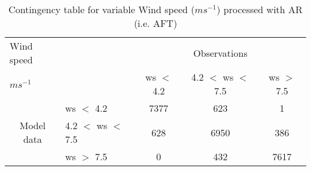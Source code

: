 \begin{table}[]
\begin{center}
\begin{tabular}{llccc}
\hline
{Wind speed}                                       &                                                    & \multicolumn{3}{c}{Observations}                 \\
{$m s^{-1}$}                                       &                             & ws $<$ 4.2   & 4.2 $<$ ws $<$ 7.5 & ws $>$ 7.5 \\
\hline
\multicolumn{1}{c}{\multirow{3}{*}{Model data}}  & ws $<$ 4.2             & 7377                & 623                       & 1              \\
                                                 & 4.2  $<$ ws $<$ 7.5 & 628                & 6950                       & 386              \\
                                                 & ws $>$ 7.5             & 0                & 432                       & 7617              \\
\hline
\end{tabular}
\end{center}
\caption{Contingency table for variable Wind speed ($m s^{-1}$) processed with AR (i.e. AFT)}
\label{tab:contingencywsAFT}
\end{table}
